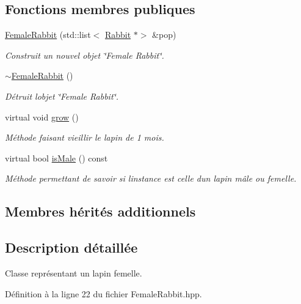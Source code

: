 \subsection*{Fonctions membres publiques}
\begin{DoxyCompactItemize}
\item 
\hyperlink{classFemaleRabbit_a40a2809fb73bb2edf2cf4c4d9147d2d9}{Female\+Rabbit} (std\+::list$<$ \hyperlink{classRabbit}{Rabbit} $\ast$$>$ \&pop)
\begin{DoxyCompactList}\small\item\em Construit un nouvel objet \char`\"{}\+Female Rabbit\char`\"{}. \end{DoxyCompactList}\item 
\hyperlink{classFemaleRabbit_a952455c7b721ab6acb770078aa5b8d5d}{$\sim$\+Female\+Rabbit} ()
\begin{DoxyCompactList}\small\item\em Détruit l\textquotesingle{}objet \char`\"{}\+Female Rabbit\char`\"{}. \end{DoxyCompactList}\item 
virtual void \hyperlink{classFemaleRabbit_ad938ea7eca97c53e89d11392b6856ebd}{grow} ()
\begin{DoxyCompactList}\small\item\em Méthode faisant vieillir le lapin de 1 mois. \end{DoxyCompactList}\item 
virtual bool \hyperlink{classFemaleRabbit_a60250dbc3758c7d31537f13b4879fe33}{is\+Male} () const
\begin{DoxyCompactList}\small\item\em Méthode permettant de savoir si l\textquotesingle{}instance est celle d\textquotesingle{}un lapin mâle ou femelle. \end{DoxyCompactList}\end{DoxyCompactItemize}
\subsection*{Membres hérités additionnels}


\subsection{Description détaillée}
Classe représentant un lapin femelle. 

Définition à la ligne 22 du fichier Female\+Rabbit.\+hpp.



